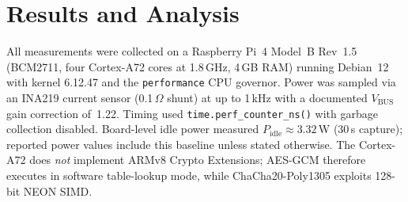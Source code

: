 
\section{Results and Analysis}
\label{sec:results}

All measurements were collected on a Raspberry Pi~4 Model~B Rev~1.5
(BCM2711, four Cortex-A72 cores at 1.8\,GHz, 4\,GB RAM) running Debian~12
with kernel 6.12.47 and the \texttt{performance} CPU governor.  Power was
sampled via an INA219 current sensor (0.1\,$\Omega$ shunt) at up to
1\,kHz with a documented $V_\text{BUS}$ gain correction of~1.22.
Timing used \texttt{time.perf\_counter\_ns()} with garbage collection
disabled.  Board-level idle power measured
$P_\text{idle} \approx 3.32$\,W (30\,s capture);
reported power values include this baseline unless stated otherwise.
The Cortex-A72 does \emph{not} implement ARMv8 Crypto Extensions;
AES-GCM therefore executes in software table-lookup mode, while
ChaCha20-Poly1305 exploits 128-bit NEON SIMD.

